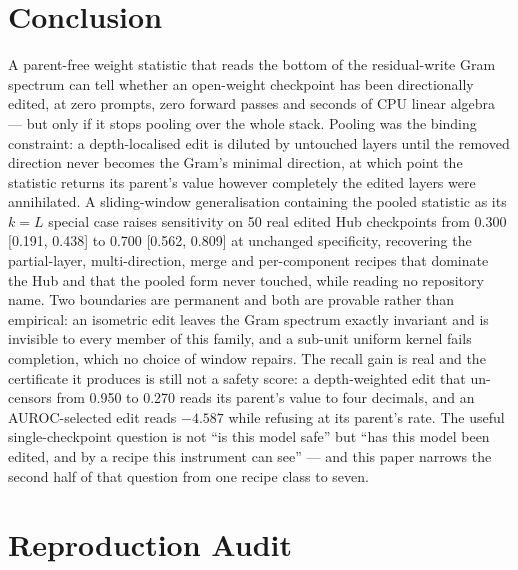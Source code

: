 \documentclass[11pt,letterpaper]{article}
\begin{document}
\section{Conclusion}

A parent-free weight statistic that reads the bottom of the residual-write Gram spectrum can tell whether an open-weight checkpoint has been directionally edited, at zero prompts, zero forward passes and seconds of CPU linear algebra --- but only if it stops pooling over the whole stack. Pooling was the binding constraint: a depth-localised edit is diluted by untouched layers until the removed direction never becomes the Gram's minimal direction, at which point the statistic returns its parent's value however completely the edited layers were annihilated. A sliding-window generalisation containing the pooled statistic as its $k = L$ special case raises sensitivity on 50 real edited Hub checkpoints from 0.300 [0.191, 0.438] to 0.700 [0.562, 0.809] at unchanged specificity, recovering the partial-layer, multi-direction, merge and per-component recipes that dominate the Hub and that the pooled form never touched, while reading no repository name. Two boundaries are permanent and both are provable rather than empirical: an isometric edit leaves the Gram spectrum exactly invariant and is invisible to every member of this family, and a sub-unit uniform kernel fails completion, which no choice of window repairs. The recall gain is real and the certificate it produces is still not a safety score: a depth-weighted edit that un-censors from 0.950 to 0.270 reads its parent's value to four decimals, and an AUROC-selected edit reads $-4.587$ while refusing at its parent's rate. The useful single-checkpoint question is not ``is this model safe'' but ``has this model been edited, and by a recipe this instrument can see'' --- and this paper narrows the second half of that question from one recipe class to seven.

\appendix

\section{Reproduction Audit}
\end{document}
